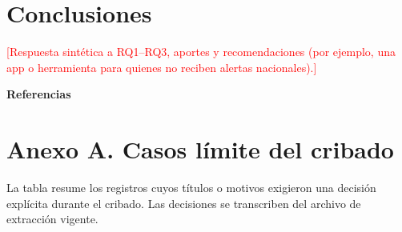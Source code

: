 \documentclass[12pt,a4paper]{article}
\newcommand{\relleno}[1]{\textcolor{red}{[#1]}}
\begin{document}
\section{Conclusiones}
\relleno{Respuesta sintética a RQ1--RQ3, aportes y recomendaciones (por ejemplo, una app o herramienta para quienes no reciben alertas nacionales).}

\newpage
\begin{center}\textbf{Referencias}\end{center}
\printbibliography[heading=none]

\clearpage
\appendix
\setcounter{table}{0}
\renewcommand{\thetable}{A\arabic{table}}
\section{Anexo A. Casos límite del cribado}
La tabla resume los registros cuyos títulos o motivos exigieron una decisión explícita durante el cribado. Las decisiones se transcriben del archivo de extracción vigente.
\end{document}
